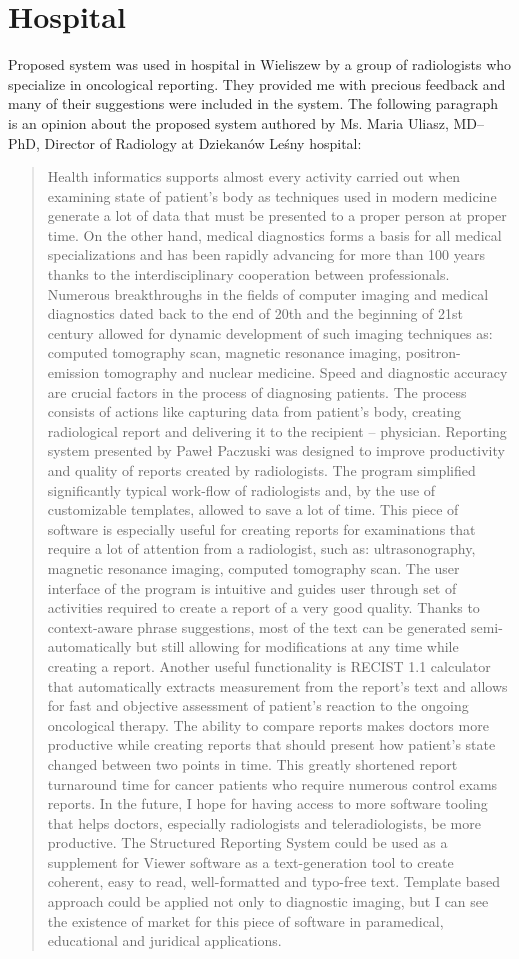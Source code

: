 \documentclass[12pt, twoside, openany]{report}
\theoremstyle{definition}
\begin{document}
\section{Hospital}
Proposed system was used in hospital in Wieliszew by a group of radiologists who specialize in oncological reporting. They provided me with precious feedback and many of their suggestions were included in the system. 
The following paragraph is an opinion about the proposed system authored by Ms. Maria Uliasz, MD–PhD, Director of Radiology at Dziekanów Leśny hospital:
\blockquote{
Health informatics supports almost every activity carried out when examining state of patient’s body as techniques used in modern medicine generate a lot of data that must be presented to a proper person at proper time.
On the other hand, medical diagnostics forms a basis for all medical specializations and has been rapidly advancing for more than 100 years thanks to the interdisciplinary cooperation between professionals. Numerous breakthroughs in the fields of computer imaging and medical diagnostics dated back to the end of 20th and the beginning of 21st century allowed for dynamic development of such imaging techniques as: computed tomography scan, magnetic resonance imaging, positron-emission tomography and nuclear medicine. 
Speed and diagnostic accuracy are crucial factors in the process of diagnosing patients. The process consists of actions like capturing data from patient’s body, creating radiological report and delivering it to the recipient – physician.
Reporting system presented by Paweł Paczuski was designed to improve productivity and quality of reports created by radiologists. The program simplified significantly typical work-flow of radiologists and, by the use of customizable templates, allowed to save a lot of time. This piece of software is especially useful for creating reports for examinations that require a lot of attention from a radiologist, such as: ultrasonography, magnetic resonance imaging, computed tomography scan. 
The user interface of the program is intuitive and guides user through set of activities required to create a report of a very good quality. Thanks to context-aware phrase suggestions, most of the text can be generated semi-automatically but still allowing for modifications at any time while creating a report. Another useful functionality is RECIST 1.1 calculator that automatically extracts measurement from the report’s text and allows for fast and objective assessment of patient’s reaction to the ongoing oncological therapy. The ability to compare reports makes doctors more productive while creating reports that should present how patient’s state changed between two points in time. This greatly shortened report turnaround time for cancer patients who require numerous control exams reports. In the future, I hope for having access to more software tooling that helps doctors, especially radiologists and teleradiologists, be more productive.
The Structured Reporting System could be used as a supplement for Viewer software as a text-generation tool to create coherent, easy to read, well-formatted and typo-free text. Template based approach could be applied not only to diagnostic imaging, but I can see the existence of market for this piece of software in paramedical, educational and juridical applications.}
\end{document}

